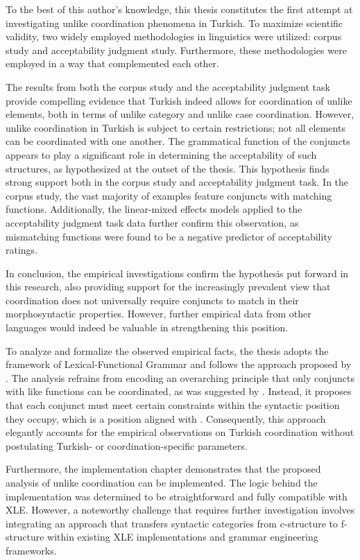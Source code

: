 \begin{sloppypar}
To the best of this author's knowledge, this thesis constitutes the first attempt at investigating unlike coordination phenomena in Turkish. To maximize scientific validity, two widely employed methodologies in linguistics were utilized: corpus study and acceptability judgment study. Furthermore, these methodologies were employed in a way that complemented each other.
\end{sloppypar}

The results from both the corpus study and the acceptability judgment task provide compelling evidence that Turkish indeed allows for coordination of unlike elements, both in terms of unlike category and unlike case coordination. However, unlike coordination in Turkish is subject to certain restrictions; not all elements can be coordinated with one another. The grammatical function of the conjuncts appears to play a significant role in determining the acceptability of such structures, as hypothesized at the outset of the thesis. This hypothesis finds strong support both in the corpus study and acceptability judgment task. In the corpus study, the vast majority of examples feature conjuncts with matching functions. Additionally, the linear-mixed effects models applied to the acceptability judgment task data further confirm this observation, as mismatching functions were found to be a negative predictor of acceptability ratings. 


In conclusion, the empirical investigations confirm the hypothesis put forward in this research, also providing support for the increasingly prevalent view that coordination does not universally require conjuncts to match in their morphosyntactic properties. However, further empirical data from other languages would indeed be valuable in strengthening this position.

To analyze and formalize the observed empirical facts, the thesis adopts the framework of Lexical-Functional Grammar and follows the approach proposed by \citet{prz:pat:21:oup}. The analysis refrains from encoding an overarching principle that only conjuncts with like functions can be coordinated, as was suggested by \citet{peterson2004}. Instead, it proposes that each conjunct must meet certain constraints within the syntactic position they occupy, which is a position aligned with \citet{prze:22:cases}. Consequently, this approach elegantly accounts for the empirical observations on Turkish coordination without postulating Turkish- or coordination-specific parameters.

Furthermore, the implementation chapter demonstrates that the proposed analysis of unlike coordination can be implemented. The logic behind the implementation was determined to be straightforward and fully compatible with XLE. However, a noteworthy challenge that requires further investigation involves integrating an approach that transfers syntactic categories from c-structure to f-structure within existing XLE implementations and grammar engineering frameworks. 